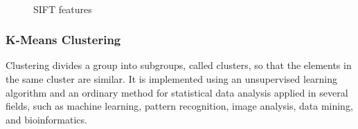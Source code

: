 \begin{figure}[]
\begin{dBox}
\centering
  \mbox{
   }
   \caption{SIFT features \label{fig:sift_example} }   
\end{dBox}   
\end{figure}
\bigskip

\subsubsection{K-Means Clustering} 
Clustering divides a group into subgroups, called clusters, so that the elements in the 
same cluster are similar. It is implemented using an unsupervised learning algorithm and an 
ordinary method for statistical data analysis applied in several fields, such as machine learning, 
pattern recognition, image analysis, data mining, and bioinformatics.
\bigskip

